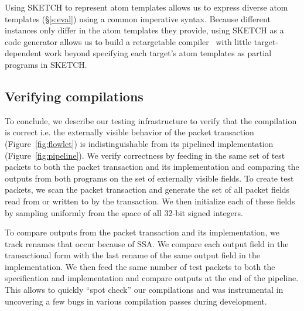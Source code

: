 Using SKETCH to represent atom templates allows us to express diverse atom
templates (\S\ref{s:eval}) using a common imperative syntax. Because different
\absmachine instances only differ in the atom templates they provide, using
SKETCH as a code generator allows us to build a retargetable
compiler~\cite{lcc} with little target-dependent work beyond specifying each
target's atom templates as partial programs in SKETCH.

\subsection{Verifying compilations}

To conclude, we describe our testing infrastructure to verify that the
compilation is correct i.e. the externally visible behavior of the packet
transaction (Figure~\ref{fig:flowlet}) is indistinguishable from its pipelined
implementation (Figure~\ref{fig:pipeline}). We verify correctness by feeding in
the same set of test packets to both the packet transaction and its
implementation and comparing the outputs from both programs on the set of
externally visible fields. To create test packets, we scan the packet
transaction and generate the set of all packet fields read from or written to
by the transaction. We then initialize each of these fields by sampling
uniformly from the space of all 32-bit signed integers.

To compare outputs from the packet transaction and its implementation, we track
renames that occur because of SSA. We compare each output field in the
transactional form with the last rename of the same output field in the
implementation. We then feed the same number of test packets to both the
specification and implementation and compare outputs at the end of the
pipeline. This allows to quickly ``spot check'' our compilations and was
instrumental in uncovering a few bugs in various compilation passes during
development.
